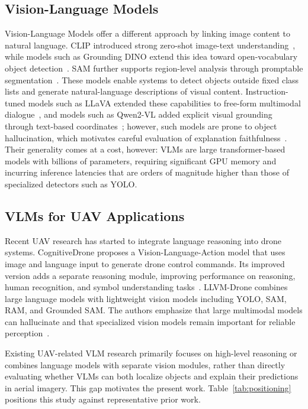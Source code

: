 \documentclass[acmtog, authorversion]{acmart}
\begin{document}
\subsection{Vision-Language Models}

Vision-Language Models offer a different approach by linking image
content to natural language. CLIP introduced strong zero-shot
image-text understanding~\cite{radford2021clip}, while models such
as Grounding DINO extend this idea toward open-vocabulary object
detection~\cite{liu2023groundingdino}. SAM further supports
region-level analysis through promptable
segmentation~\cite{kirillov2023sam}. These models enable systems to
detect objects outside fixed class lists and generate natural-language
descriptions of visual content. Instruction-tuned models such as LLaVA
extended these capabilities to free-form multimodal
dialogue~\cite{liu2023llava}, and models such as Qwen2-VL added
explicit visual grounding through text-based
coordinates~\cite{wang2024qwen2vl}; however, such models are prone to
object hallucination, which motivates careful evaluation of
explanation faithfulness~\cite{li2023pope}. Their generality comes at a
cost,
however: VLMs are large transformer-based models with billions of
parameters, requiring significant GPU memory and incurring inference
latencies that are orders of magnitude higher than those of
specialized detectors such as YOLO.

\subsection{VLMs for UAV Applications}

Recent UAV research has started to integrate language reasoning into
drone systems. CognitiveDrone proposes a Vision-Language-Action model
that uses image and language input to generate drone control commands.
Its improved version adds a separate reasoning module, improving
performance on reasoning, human recognition, and symbol understanding
tasks~\cite{lykov2025cognitivedrone}. LLVM-Drone combines large
language models with lightweight vision models including YOLO, SAM,
RAM, and Grounded SAM. The authors emphasize that large multimodal
models can hallucinate and that specialized vision models remain
important for reliable perception~\cite{hu2025llvmdrone}.

Existing UAV-related VLM research primarily focuses on high-level
reasoning or combines language models with separate vision modules,
rather than directly evaluating whether VLMs can both localize objects
and explain their predictions in aerial imagery. This gap motivates
the present work. Table~\ref{tab:positioning} positions this study
against representative prior work.
\end{document}
